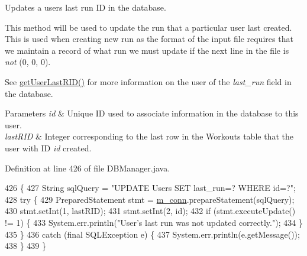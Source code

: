 Updates a user\textquotesingle{}s last run ID in the database.

This method will be used to update the run that a particular user last created. This is used when creating new run as the format of the input file requires that we maintain a record of what run we must update if the next line in the file is {\itshape not} (0, 0, 0).

See \mbox{\hyperlink{classcom_1_1activitytracker_1_1_d_b_manager_aab14c61b3f3a17bdea10cab1b5fd9337}{get\+User\+Last\+R\+I\+D()}} for more information on the user of the {\itshape last\+\_\+run} field in the database.


\begin{DoxyParams}{Parameters}
{\em id} & Unique ID used to associate information in the database to this user. \\
\hline
{\em last\+R\+ID} & Integer corresponding to the last row in the Workouts table that the user with ID {\itshape id} created. \\
\hline
\end{DoxyParams}


Definition at line 426 of file D\+B\+Manager.\+java.


\begin{DoxyCode}
426                                                                 \{
427         String sqlQuery = \textcolor{stringliteral}{"UPDATE Users SET last\_run=? WHERE id=?"};
428         \textcolor{keywordflow}{try} \{
429             PreparedStatement stmt = \mbox{\hyperlink{classcom_1_1activitytracker_1_1_d_b_manager_a064088d13ac09eb147fdc19268771521}{m\_conn}}.prepareStatement(sqlQuery);
430             stmt.setInt(1, lastRID);
431             stmt.setInt(2, \textcolor{keywordtype}{id});
432             \textcolor{keywordflow}{if} (stmt.executeUpdate() != 1) \{
433                 System.err.println(\textcolor{stringliteral}{"User's last run was not updated correctly."});
434             \}
435         \}
436         \textcolor{keywordflow}{catch} (\textcolor{keyword}{final} SQLException e) \{
437             System.err.println(e.getMessage());
438         \}
439     \}
\end{DoxyCode}
\mbox{\label{classcom_1_1activitytracker_1_1_d_b_manager_af05d79f33ecf2920a67d1b9cf82c079f}} 
